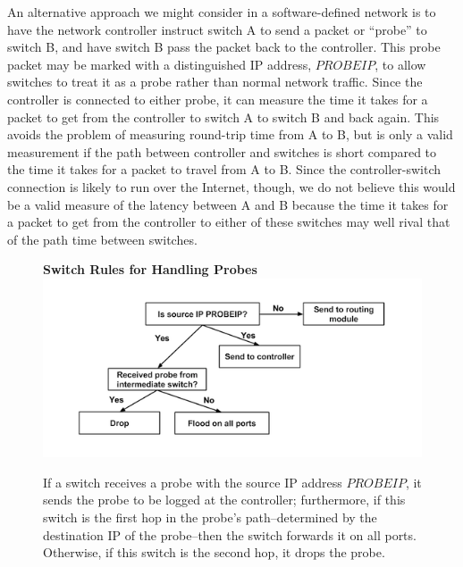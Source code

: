 \documentclass[pageno]{jpaper}
\begin{document}
An alternative approach we might consider in a software-defined network is to have the network controller 
instruct switch A to send a packet or ``probe'' to switch B, and have switch B pass the packet back 
to the controller. This probe packet may be marked with a distinguished IP address, $PROBEIP$, to allow
switches to treat it as a probe rather than normal network traffic. 
Since the controller is connected to either probe, it can measure the time it takes 
for a packet to get from the controller to switch A to switch B and back again.  This avoids the problem 
of measuring round-trip time from A to B, but is only a valid measurement if the path between controller 
and switches is short compared to the time it takes for a packet to travel from A to B. Since the 
controller-switch connection is likely to run over the Internet, though, we do not believe this would be 
a valid measure of the latency between A and B because the time it takes for a packet to get from the controller
to either of these switches may well rival that of the path time between switches.

\begin{figure}
{\bf Switch Rules for Handling Probes }
\centering
\includegraphics[scale=0.7]{probeHandler.png}
\caption{If a switch receives a probe with the source IP address $PROBEIP$, it sends the probe to be logged at the controller; furthermore, if this switch is the first hop in the probe's path--determined by the destination IP of the probe--then the switch forwards it on all ports.  Otherwise, if this switch is the second hop, it drops the probe.}
\end{figure}
\end{document}
